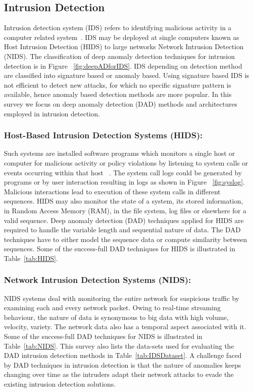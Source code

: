 \subsection{Intrusion Detection}
\label{sec:intrusion_detection}

Intrusion detection  system (IDS) refers to identifying malicious activity in a computer related system~\cite{phoha2002internet}. IDS may be deployed at single computers known as Host Intrusion Detection (HIDS) to large networks Network Intrusion Detection (NIDS). The classification of deep anomaly detection techniques for intrusion detection is in Figure ~\ref{fig:deepADforIDS}. IDS depending on detection method are classified into signature based or anomaly based. Using signature based IDS is not efficient to detect new attacks, for which no specific signature pattern is available, hence anomaly based detection methods are more popular. In this survey we focus on deep anomaly detection (DAD) methods and architectures employed in intrusion detection.
\vspace{-0.3cm}
\subsubsection{Host-Based Intrusion Detection Systems (HIDS):}
 Such systems are installed software programs which monitors a single host or computer for malicious  activity or policy violations by listening to system calls or events occurring within that host ~\cite{vigna2005host}. The system call logs could be generated by programs or by user interaction resulting in logs as shown in Figure ~\ref{fig:syslog}. Malicious interactions lead to execution of these system calls in different sequences. HIDS may also monitor the state of a system, its stored information, in Random Access Memory (RAM), in the file system, log files or elsewhere for a valid sequence.
 Deep anomaly detection (DAD) techniques applied for HIDS are required to handle the variable length and sequential nature of data. The DAD techniques have to either model the sequence data or compute similarity between sequences. Some of the success-full DAD techniques for HIDS is illustrated in Table~\ref{tab:HIDS}.

\subsubsection{Network Intrusion Detection Systems (NIDS):} NIDS systems deal with monitoring the entire network for suspicious traffic by examining each and every network packet. Owing to real-time streaming behaviour, the nature of data is synonymous to big data with high volume, velocity, variety. The network data also has a temporal aspect associated with it. Some of the success-full DAD techniques for NIDS is illustrated in Table~\ref{tab:NIDS}. This survey also lists the data-sets used for evaluating the DAD intrusion detection methods in Table~\ref{tab:IDSDataset}. A challenge faced by DAD techniques in intrusion detection is that the nature of anomalies keeps changing over time as the intruders adapt their network attacks to evade the existing intrusion detection solutions.

